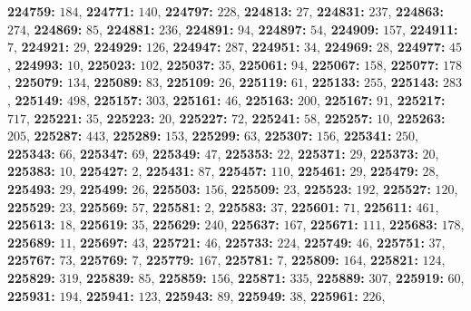 \textsf{\bfseries 224759:} $184$, \textsf{\bfseries 224771:} $140$, \textsf{\bfseries 224797:} $228$, \textsf{\bfseries 224813:} $27$, \textsf{\bfseries 224831:} $237$, \textsf{\bfseries 224863:} $274$, \textsf{\bfseries 224869:} $85$, \textsf{\bfseries 224881:} $236$, \textsf{\bfseries 224891:} $94$, \textsf{\bfseries 224897:} $54$, \textsf{\bfseries 224909:} $157$, \textsf{\bfseries 224911:} $7$, \textsf{\bfseries 224921:} $29$, \textsf{\bfseries 224929:} $126$, \textsf{\bfseries 224947:} $287$, \textsf{\bfseries 224951:} $34$, \textsf{\bfseries 224969:} $28$, \textsf{\bfseries 224977:} $45$, \textsf{\bfseries 224993:} $10$, \textsf{\bfseries 225023:} $102$, \textsf{\bfseries 225037:} $35$, \textsf{\bfseries 225061:} $94$, \textsf{\bfseries 225067:} $158$, \textsf{\bfseries 225077:} $178$, \textsf{\bfseries 225079:} $134$, \textsf{\bfseries 225089:} $83$, \textsf{\bfseries 225109:} $26$, \textsf{\bfseries 225119:} $61$, \textsf{\bfseries 225133:} $255$, \textsf{\bfseries 225143:} $283$, \textsf{\bfseries 225149:} $498$, \textsf{\bfseries 225157:} $303$, \textsf{\bfseries 225161:} $46$, \textsf{\bfseries 225163:} $200$, \textsf{\bfseries 225167:} $91$, \textsf{\bfseries 225217:} $717$, \textsf{\bfseries 225221:} $35$, \textsf{\bfseries 225223:} $20$, \textsf{\bfseries 225227:} $72$, \textsf{\bfseries 225241:} $58$, \textsf{\bfseries 225257:} $10$, \textsf{\bfseries 225263:} $205$, \textsf{\bfseries 225287:} $443$, \textsf{\bfseries 225289:} $153$, \textsf{\bfseries 225299:} $63$, \textsf{\bfseries 225307:} $156$, \textsf{\bfseries 225341:} $250$, \textsf{\bfseries 225343:} $66$, \textsf{\bfseries 225347:} $69$, \textsf{\bfseries 225349:} $47$, \textsf{\bfseries 225353:} $22$, \textsf{\bfseries 225371:} $29$, \textsf{\bfseries 225373:} $20$, \textsf{\bfseries 225383:} $10$, \textsf{\bfseries 225427:} $2$, \textsf{\bfseries 225431:} $87$, \textsf{\bfseries 225457:} $110$, \textsf{\bfseries 225461:} $29$, \textsf{\bfseries 225479:} $28$, \textsf{\bfseries 225493:} $29$, \textsf{\bfseries 225499:} $26$, \textsf{\bfseries 225503:} $156$, \textsf{\bfseries 225509:} $23$, \textsf{\bfseries 225523:} $192$, \textsf{\bfseries 225527:} $120$, \textsf{\bfseries 225529:} $23$, \textsf{\bfseries 225569:} $57$, \textsf{\bfseries 225581:} $2$, \textsf{\bfseries 225583:} $37$, \textsf{\bfseries 225601:} $71$, \textsf{\bfseries 225611:} $461$, \textsf{\bfseries 225613:} $18$, \textsf{\bfseries 225619:} $35$, \textsf{\bfseries 225629:} $240$, \textsf{\bfseries 225637:} $167$, \textsf{\bfseries 225671:} $111$, \textsf{\bfseries 225683:} $178$, \textsf{\bfseries 225689:} $11$, \textsf{\bfseries 225697:} $43$, \textsf{\bfseries 225721:} $46$, \textsf{\bfseries 225733:} $224$, \textsf{\bfseries 225749:} $46$, \textsf{\bfseries 225751:} $37$, \textsf{\bfseries 225767:} $73$, \textsf{\bfseries 225769:} $7$, \textsf{\bfseries 225779:} $167$, \textsf{\bfseries 225781:} $7$, \textsf{\bfseries 225809:} $164$, \textsf{\bfseries 225821:} $124$, \textsf{\bfseries 225829:} $319$, \textsf{\bfseries 225839:} $85$, \textsf{\bfseries 225859:} $156$, \textsf{\bfseries 225871:} $335$, \textsf{\bfseries 225889:} $307$, \textsf{\bfseries 225919:} $60$, \textsf{\bfseries 225931:} $194$, \textsf{\bfseries 225941:} $123$, \textsf{\bfseries 225943:} $89$, \textsf{\bfseries 225949:} $38$, \textsf{\bfseries 225961:} $226$, 
